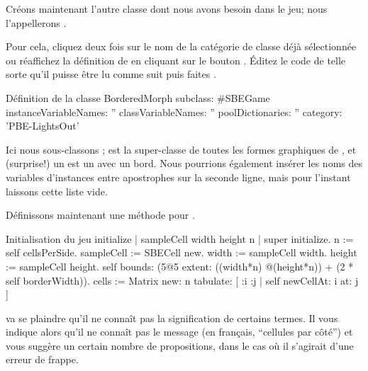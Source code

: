 \documentclass[a4paper,10pt,twoside]{book}
\begin{document}
Créons maintenant l'autre classe dont nous avons besoin dans le jeu; nous l'appellerons .

Pour cela, cliquez deux fois sur le nom de la catégorie de classe
déjà sélectionnée ou réaffichez la définition de  en cliquant sur le bouton .
Éditez le code de telle sorte qu'il puisse \^etre lu comme suit puis faites .

\begin{classdef}[sbegame]{Définition de la classe }
BorderedMorph subclass: #SBEGame
   instanceVariableNames: ''
   classVariableNames: ''
   poolDictionaries: ''
   category: 'PBE-LightsOut'
\end{classdef}

Ici nous sous-classons ;  est la
super-classe de toutes les formes graphiques de \pharo, et (surprise!)
un  est un  avec un bord.  
Nous pourrions également insérer les noms des variables d'instances
entre apostrophes sur la seconde ligne, mais pour l'instant 
laissons cette liste vide.

Définissons maintenant une méthode  pour .


\begin{numMethod}[sbegameinitialize]{Initialisation du jeu}
initialize
   | sampleCell width height n |
   super initialize.
   n := self cellsPerSide.
   sampleCell := SBECell new.
   width := sampleCell width.
   height := sampleCell height.
   self bounds: (5@5 extent: ((width*n) @(height*n)) + (2 * self borderWidth)).
   cells := Matrix new: n tabulate: [ :i :j | self newCellAt: i at: j ]
\end{numMethod}


\pharo va se plaindre qu'il ne conna\^it pas la signification de
certains termes.
Il vous indique alors qu'il ne conna\^it pas le message
 (en fran\c{c}ais, ``cellules par c\^oté'') et
vous suggère un certain nombre de propositions, dans le cas o\`u il
s'agirait d'une erreur de frappe.
\end{document}
